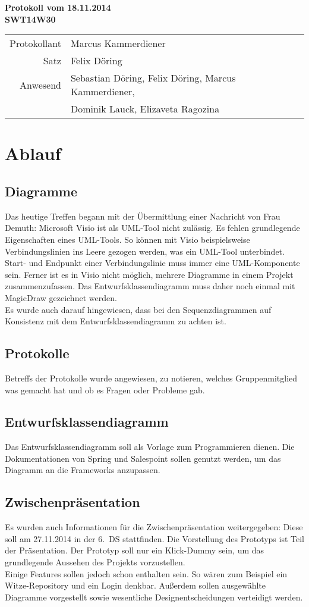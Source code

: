 \documentclass{scrartcl}
\begin{document}
\begin{center}
\LARGE \bf{Protokoll vom 18.11.2014 \\
SWT14W30}
\end{center}

\begin{tabular}{rp{10cm}}
Protokollant & Marcus Kammerdiener \\
Satz & Felix Döring \\
Anwesend & Sebastian Döring, Felix Döring, Marcus Kammerdiener,\\
& Dominik Lauck, Elizaveta Ragozina \\
\end{tabular}

\vspace*{3em}

\section{Ablauf}
\subsection{Diagramme}
Das heutige Treffen begann mit der Übermittlung einer Nachricht von Frau Demuth: Microsoft Visio ist als UML-Tool nicht zulässig. Es fehlen grundlegende Eigenschaften eines UML-Tools. So können mit Visio beispielsweise Verbindungslinien ins Leere gezogen werden, was ein UML-Tool unterbindet. Start- und Endpunkt einer Verbindungslinie muss immer eine UML-Komponente sein. Ferner ist es in Visio nicht möglich, mehrere Diagramme in einem Projekt zusammenzufassen. Das Entwurfsklassendiagramm muss daher noch einmal mit MagicDraw gezeichnet werden. \\
Es wurde auch darauf hingewiesen, dass bei den Sequenzdiagrammen auf Konsistenz mit dem Entwurfsklassendiagramm zu achten ist.
\subsection{Protokolle}
Betreffs der Protokolle wurde angewiesen, zu notieren, welches Gruppenmitglied was gemacht hat und ob es Fragen oder Probleme gab.
\subsection{Entwurfsklassendiagramm}
Das Entwurfsklassendiagramm soll als Vorlage zum Programmieren dienen. Die Dokumentationen von Spring und Salespoint sollen genutzt werden, um das Diagramm an die Frameworks anzupassen.
\subsection{Zwischenpräsentation}
Es wurden auch Informationen für die Zwischenpräsentation weitergegeben: Diese soll am 27.11.2014 in der 6.~DS stattfinden. Die Vorstellung des Prototyps ist Teil der Präsentation. Der Prototyp soll nur ein Klick-Dummy sein, um das grundlegende Aussehen des Projekts vorzustellen. \\
Einige Features sollen jedoch schon enthalten sein. So wären zum Beispiel ein Witze-Repository und ein Login denkbar. Außerdem sollen ausgewählte Diagramme vorgestellt sowie wesentliche Designentscheidungen verteidigt werden.
\end{document}
